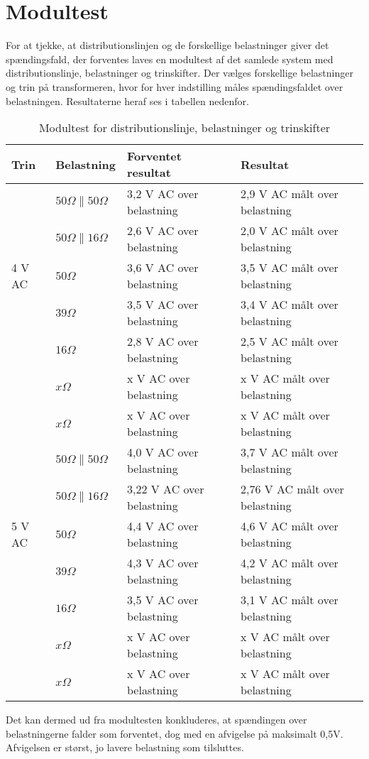 

\section{Modultest}

For at tjekke, at distributionslinjen og de forskellige belastninger giver det spændingsfald, der forventes laves en modultest af det samlede system med distributionslinje, belastninger og trinskifter. Der vælges forskellige belastninger og trin på transformeren, hvor for hver indstilling måles spændingsfaldet over belastningen. Resultaterne heraf ses i tabellen nedenfor. 


\begin{table}[H]
	\centering
	\begin{tabular}{|l|l|l|l|}
		\hline
		\textbf{Trin} & \textbf{Belastning} & \textbf{Forventet resultat} & \textbf{Resultat} \\\hline
		
		\multirow{5}{*}{4 V AC} 
		& $50 \Omega\parallel 50 \Omega$ & 3,2 V AC over belastning & 2,9 V AC målt over belastning \\\hhline{~---} 	
		& $50 \Omega\parallel 16 \Omega$ & 2,6 V AC over belastning & 2,0 V AC målt over belastning \\\hhline{~---}
		& $50 \Omega$ & 3,6 V AC over belastning & 3,5 V AC målt over belastning \\\hhline{~---} 	
		& $39 \Omega$ & 3,5 V AC over belastning & 3,4 V AC målt over belastning \\\hhline{~---} 
		& $16 \Omega$ & 2,8 V AC over belastning & 2,5 V AC målt over belastning \\\hhline{~---} 
		& $x \Omega$ & x V AC over belastning & x V AC målt over belastning \\\hhline{~---} 
		& $x \Omega$ & x V AC over belastning & x V AC målt over belastning \\\hline 
	
		
		\multirow{5}{*}{5 V AC} 
		& $50 \Omega\parallel 50 \Omega$ & 4,0 V AC over belastning & 3,7 V AC målt over belastning \\\hhline{~---} 	
		& $50 \Omega\parallel 16 \Omega$ & 3,22 V AC over belastning & 2,76 V AC målt over belastning \\\hhline{~---}
		& $50 \Omega$ & 4,4 V AC over belastning & 4,6 V AC målt over belastning \\\hhline{~---} 	
		& $39 \Omega$ & 4,3 V AC over belastning & 4,2 V AC målt over belastning \\\hhline{~---} 
		& $16 \Omega$ & 3,5 V AC over belastning & 3,1 V AC målt over belastning \\\hhline{~---} 
		& $x \Omega$ & x V AC over belastning & x V AC målt over belastning \\\hhline{~---} 
		& $x \Omega$ & x V AC over belastning & x V AC målt over belastning \\\hline 
		
	\end{tabular}
	\caption{Modultest for distributionslinje, belastninger og trinskifter}
	\label{tab:Modultesttrin}
\end{table}

Det kan dermed ud fra modultesten konkluderes, at spændingen over belastningerne falder som forventet, dog med en afvigelse på maksimalt 0,5V. Afvigelsen er størst, jo lavere belastning som tilsluttes. 


